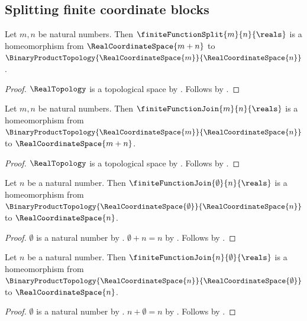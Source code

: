\subsection{Splitting finite coordinate blocks}

\begin{theorem}\label{real_finite_coordinate_split_homeomorphism}
    Let $m,n$ be natural numbers.
    Then $\finiteFunctionSplit{m}{n}{\reals}$ is a homeomorphism from
        $\RealCoordinateSpace{m+n}$ to
        $\BinaryProductTopology{\RealCoordinateSpace{m}}{\RealCoordinateSpace{n}}$.
\end{theorem}
\begin{proof}
    $\RealTopology$ is a topological space by .
    Follows by .
\end{proof}

\begin{theorem}\label{real_finite_coordinate_join_homeomorphism}
    Let $m,n$ be natural numbers.
    Then $\finiteFunctionJoin{m}{n}{\reals}$ is a homeomorphism from
        $\BinaryProductTopology{\RealCoordinateSpace{m}}{\RealCoordinateSpace{n}}$ to
        $\RealCoordinateSpace{m+n}$.
\end{theorem}
\begin{proof}
    $\RealTopology$ is a topological space by .
    Follows by .
\end{proof}

\begin{corollary}\label{real_finite_coordinate_left_unit}
    Let $n$ be a natural number.
    Then $\finiteFunctionJoin{\emptyset}{n}{\reals}$ is a homeomorphism from
        $\BinaryProductTopology{\RealCoordinateSpace{\emptyset}}{\RealCoordinateSpace{n}}$ to
        $\RealCoordinateSpace{n}$.
\end{corollary}
\begin{proof}
    $\emptyset$ is a natural number by .
    $\emptyset+n=n$ by .
    Follows by .
\end{proof}

\begin{corollary}\label{real_finite_coordinate_right_unit}
    Let $n$ be a natural number.
    Then $\finiteFunctionJoin{n}{\emptyset}{\reals}$ is a homeomorphism from
        $\BinaryProductTopology{\RealCoordinateSpace{n}}{\RealCoordinateSpace{\emptyset}}$ to
        $\RealCoordinateSpace{n}$.
\end{corollary}
\begin{proof}
    $\emptyset$ is a natural number by .
    $n+\emptyset=n$ by .
    Follows by .
\end{proof}

